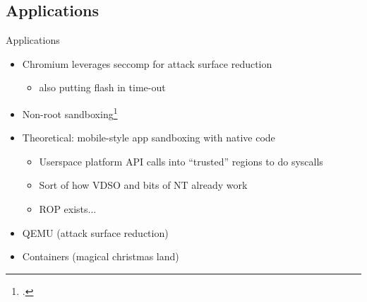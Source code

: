 \documentclass[handout]{beamer}
\begin{document}
\subsection{Applications}
\begin{frame}{Applications}
 \begin{itemize}
  \item Chromium leverages seccomp for attack surface reduction
  \begin{itemize}
   \item also putting flash in time-out
  \end{itemize}
  \item Non-root sandboxing\footcite{mbox}
  \item Theoretical: mobile-style app sandboxing with native code
  \begin{itemize}
   \item Userspace platform API calls into ``trusted'' regions to do syscalls
   \item Sort of how VDSO and bits of NT already work
   \item ROP exists...
  \end{itemize}
  \item QEMU (attack surface reduction)
  \item Containers (magical christmas land)
 \end{itemize}
\end{frame}



\begin{frame}
 \printbibliography
\end{frame}
\end{document}
